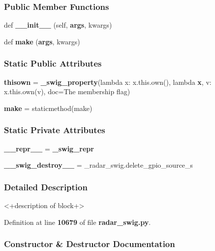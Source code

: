 \subsubsection*{Public Member Functions}
\begin{DoxyCompactItemize}
\item 
def {\bf \+\_\+\+\_\+init\+\_\+\+\_\+} (self, {\bf args}, kwargs)
\item 
def {\bf make} ({\bf args}, kwargs)
\end{DoxyCompactItemize}
\subsubsection*{Static Public Attributes}
\begin{DoxyCompactItemize}
\item 
{\bf thisown} = {\bf \+\_\+swig\+\_\+property}(lambda x\+: x.\+this.\+own(), lambda {\bf x}, v\+: x.\+this.\+own(v), doc=\textquotesingle{}The membership flag\textquotesingle{})
\item 
{\bf make} = staticmethod(make)
\end{DoxyCompactItemize}
\subsubsection*{Static Private Attributes}
\begin{DoxyCompactItemize}
\item 
{\bf \+\_\+\+\_\+repr\+\_\+\+\_\+} = {\bf \+\_\+swig\+\_\+repr}
\item 
{\bf \+\_\+\+\_\+swig\+\_\+destroy\+\_\+\+\_\+} = \+\_\+radar\+\_\+swig.\+delete\+\_\+gpio\+\_\+source\+\_\+s
\end{DoxyCompactItemize}


\subsubsection{Detailed Description}
\begin{DoxyVerb}<+description of block+>\end{DoxyVerb}
 

Definition at line {\bf 10679} of file {\bf radar\+\_\+swig.\+py}.



\subsubsection{Constructor \& Destructor Documentation}
